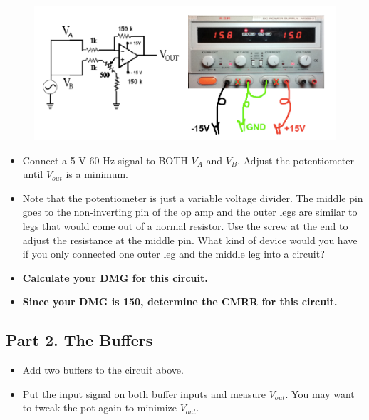 \documentclass[12pt]{article}
\begin{document}
\begin{figure}[!h]
\begin{center}
\includegraphics[width=\textwidth,trim=0 0 0 0,clip=false]{figures/circuitandps.png}
\end{center}
\end{figure}

\begin{itemize}
\item Connect a 5 V 60 Hz signal to BOTH $V_A$ and $V_B$. Adjust the potentiometer until $V_{out}$ is a minimum.
\item Note that the potentiometer is just a variable voltage divider. 
The middle pin goes to the non-inverting pin of the op amp and the outer legs are similar to legs that would come out of a normal resistor. 
Use the screw at the end to adjust the resistance at the middle pin. 
What kind of device would you have if you only connected one outer leg and the middle leg into a circuit?
\end{itemize}

\begin{itemize}
\item \textbf{Calculate your DMG for this circuit.}
\item \textbf{Since your DMG is 150, determine the CMRR for this circuit.}
\end{itemize}

\subsection*{Part 2. The Buffers}
\begin{itemize}
\item Add two buffers to the circuit above.
\item Put the input signal on both buffer inputs and measure $V_{out}$. 
You may want to tweak the pot again to minimize $V_{out}$.
\end{itemize}
\end{document}
